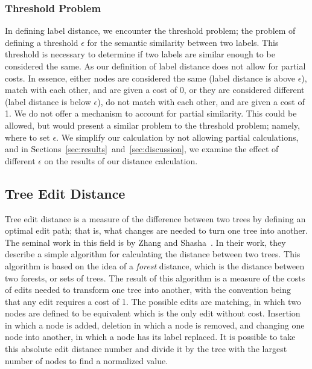 \subsubsection{Threshold Problem}
\label{sssec:threshold-problem}

In defining label distance, we encounter the threshold problem; the problem of defining a threshold $\epsilon$ for the semantic similarity between two labels. This threshold is necessary to determine if two labels are similar enough to be considered the same. As our definition of label distance does not allow for partial costs. In essence, either nodes are considered the same (label distance is above $\epsilon$), match with each other, and are given a cost of 0, or they are considered different (label distance is below $\epsilon$), do not match with each other, and are given a cost of 1. We do not offer a mechanism to account for partial similarity. This could be allowed, but would present a similar problem to the threshold problem; namely, where to set $\epsilon$. We simplify our calculation by not allowing partial calculations, and in Sections~\ref{sec:results}~and~\ref{sec:discussion}, we examine the effect of different $\epsilon$ on the results of our distance calculation.



\subsection{Tree Edit Distance}

Tree edit distance is a measure of the difference between two trees by defining an optimal edit path; that is, what changes are needed to turn one tree into another. The seminal work in this field is by Zhang and Shasha~\cite{Zhang_Shasha_1989}. In their work, they describe a simple algorithm for calculating the distance between two trees. This algorithm is based on the idea of a \textit{forest} distance, which is the distance between two forests, or sets of trees. The result of this algorithm is a measure of the costs of edits needed to transform one tree into another, with the convention being that any edit requires a cost of 1. The possible edits are matching, in which two nodes are defined to be equivalent which is the only edit without cost. Insertion in which a node is added, deletion in which a node is removed, and changing one node into another, in which a node has its label replaced. It is possible to take this absolute edit distance number and divide it by the tree with the largest number of nodes to find a normalized value.


